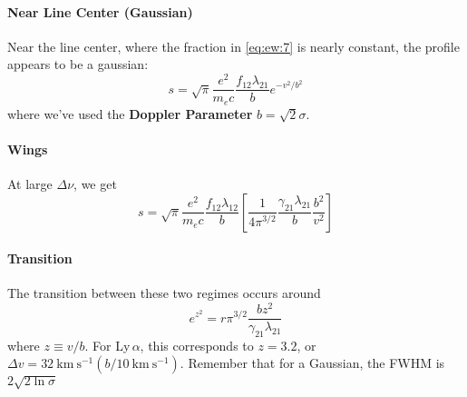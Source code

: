 \documentclass[10pt]{article}
\numberwithin{equation}{section}
\begin{document}
\paragraph{Near Line Center (Gaussian)} %
\label{par:near_line_center_gaussian_}
Near the line center, where the fraction in \eqref{eq:ew:7} is nearly constant,
the profile appears to be a gaussian:
\begin{equation}
  \label{eq:ew:8} s = \sqrt{\pi} \frac{e^2}{m_e c} \frac{f_{12}\lambda_{21}}{b}
  e^{-v^2/b^2}
\end{equation}
where we've used the \textbf{Doppler Parameter} $b=\sqrt{2}\sigma$. 

\paragraph{Wings} %
\label{par:wings}At large $\Delta \nu$, we get
\begin{equation}
  \label{eq:ew:9} s = \sqrt{\pi} \frac{e^2}{m_ec}\frac{f_{12}\lambda_{12}}{b}
  \left[\frac{1}{4\pi^{3/2}}\frac{\gamma_{21}\lambda_{21}}{b}\frac{b^2}{v^2}
  \right]
\end{equation}

\paragraph{Transition} %
\label{par:transition}
The transition between these two regimes occurs around 
\begin{equation}
  \label{eq:ew:10} e^{z^2}=r\pi^{3/2} \frac{bz^2}{\gamma_{21}\lambda_{21}}
\end{equation}
where $z\equiv v/b$. For Ly\,$\alpha$, this corresponds to $z = 3.2$, or
$\Delta v = 32\ \mathrm{km\ s^{-1}}(b/10\ \mathrm{km\ s^{-1}})$. Remember that
for a Gaussian, the FWHM is $2\sqrt{2\ln\sigma}$\\
\end{document}
